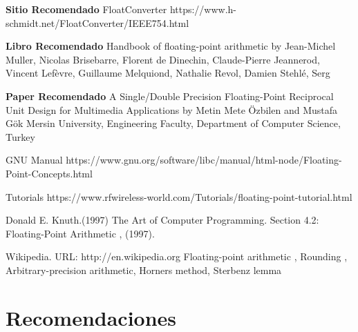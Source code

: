 \documentclass[a4paper,10pt,twocolumn]{article}
\begin{document}
	
	
	
	
	
	
	
	
	
	\begin{thebibliography}{99}
		 \textbf{Sitio Recomendado} FloatConverter {https://www.h-schmidt.net/FloatConverter/IEEE754.html}
		
		  \textbf{Libro Recomendado} Handbook of floating-point arithmetic { by Jean-Michel Muller, Nicolas Brisebarre, Florent de Dinechin, Claude-Pierre Jeannerod, Vincent Lefèvre, Guillaume Melquiond, Nathalie Revol, Damien Stehlé, Serg}
		
		  \textbf{Paper Recomendado} A Single/Double Precision Floating-Point Reciprocal Unit Design for Multimedia Applications
		{by Metin Mete Özbilen and Mustafa Gök	Mersin University, Engineering Faculty, Department of Computer Science, Turkey}
		
		 GNU Manual https://www.gnu.org/software/libc/manual/html-node/Floating-Point-Concepts.html
		
		 Tutorials https://www.rfwireless-world.com/Tutorials/floating-point-tutorial.html
		
		
		 Donald E. Knuth.(1997) {The Art of Computer Programming}.
		Section 4.2: Floating-Point Arithmetic , (1997).
		
		 Wikipedia. URL: http://en.wikipedia.org
		Floating-point arithmetic ,
		Rounding ,
		Arbitrary-precision arithmetic, 
		Horners method, 
		Sterbenz lemma 
		
	
		
	\end{thebibliography}
	
	\pagebreak
	
	\section{Recomendaciones}
	
\end{document}
